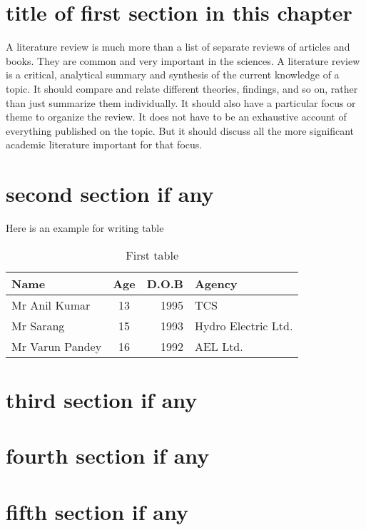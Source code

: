 \section{title of first section in this chapter}
A literature review is much more than a list of separate reviews of articles and books.  They are common and very important in the sciences.  A literature review is a critical, analytical summary and synthesis of the current knowledge of a topic.  It should compare and relate different theories, findings, and so on, rather than just summarize them individually.  It should also have a particular focus or theme to organize the review.  It does not have to be an exhaustive account of everything published on the topic.  But it should discuss all the more significant academic literature important for that focus.  

\section{second section if any}
Here is an example for writing table 
\begin{table}[h]
	\centering
	\begin{tabular}{|l|c|r|l|} \hline
		Name & Age & D.O.B & Agency \\ \hline
		Mr Anil Kumar & 13 & 1995 & TCS\\ \hline
		Mr Sarang  & 15 & 1993 & Hydro Electric Ltd.\\ \hline
		Mr Varun Pandey & 16 & 1992 & AEL Ltd.\\ \hline
	\end{tabular}
	\caption{First table}
\end{table}


\section{third section if any}      


\section{fourth section if any}



\section{fifth section if any}

